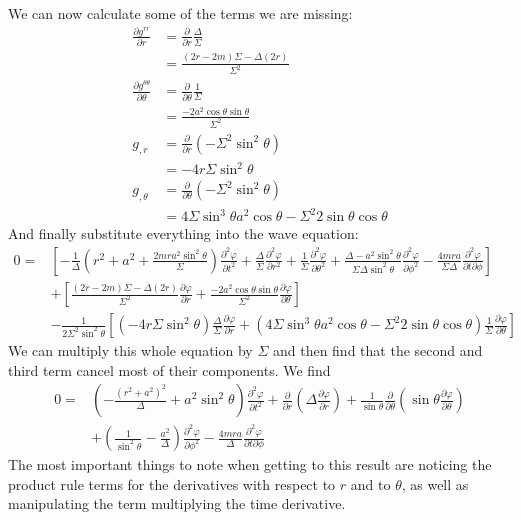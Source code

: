 \documentclass[11pt]{article}
\numberwithin{equation}{section}
\numberwithin{figure}{section}
\numberwithin{table}{section}
\begin{document}
We can now calculate some of the terms we are missing:
\begin{align*}
    \frac{\partial g^{rr}}{\partial r}&=\frac{\partial}{\partial r}\frac{\Delta}{\Sigma}\\
    &=\frac{(2r-2m)\Sigma-\Delta(2r)}{\Sigma^2}\\
    \frac{\partial g^{\theta\theta}}{\partial \theta}&=\frac{\partial}{\partial \theta}\frac{1}{\Sigma}\\
    &=\frac{-2a^2\cos\theta\sin\theta}{\Sigma^2}\\
    g_{,r}&=\frac{\partial}{\partial r}(-\Sigma^2\sin^2\theta)\\
    &=-4r\Sigma\sin^2\theta\\
    g_{,\theta}&=\frac{\partial}{\partial \theta}(-\Sigma^2\sin^2\theta)\\
    &=4\Sigma\sin^3\theta a^2\cos\theta-\Sigma^2 2\sin\theta\cos\theta
\end{align*}
And finally substitute everything into the wave equation:
\begin{align*}
    0=&\left[-\frac{1}{\Delta}\left(r^2+a^2+\frac{2mra^2\sin^2\theta}{\Sigma}\right)\frac{\partial^2\varphi}{\partial t^2}+\frac{\Delta}{\Sigma}\frac{\partial^2\varphi}{\partial r^2}+\frac{1}{\Sigma}\frac{\partial^2\varphi}{\partial\theta^2}+\frac{\Delta-a^2\sin^2\theta}{\Sigma\Delta\sin^2\theta}\frac{\partial^2\varphi}{\partial\phi^2}-\frac{4mra}{\Sigma\Delta}\frac{\partial^2\varphi}{\partial t\partial\phi}\right]\\
    &+\left[\frac{(2r-2m)\Sigma-\Delta(2r)}{\Sigma^2}\frac{\partial\varphi}{\partial r}+\frac{-2a^2\cos\theta\sin\theta}{\Sigma^2}\frac{\partial \varphi}{\partial \theta}\right]\\&-\frac{1}{2\Sigma^2\sin^2\theta}\left[(-4r\Sigma\sin^2\theta)\frac{\Delta}{\Sigma}\frac{\partial\varphi}{\partial r}+(4\Sigma\sin^3\theta a^2\cos\theta-\Sigma^2 2\sin\theta\cos\theta)\frac{1}{\Sigma}\frac{\partial\varphi}{\partial\theta}\right]
\end{align*}
We can multiply this whole equation by $\Sigma$ and then find that the second and third term cancel most of their components. We find
\begin{equation}
    \begin{aligned}
        0=&\left(-\frac{(r^2+a^2)^2}{\Delta}+a^2\sin^2\theta\right)\frac{\partial^2\varphi}{\partial t^2}+\frac{\partial}{\partial r}\left(\Delta\frac{\partial\varphi}{\partial r}\right)+\frac{1}{\sin\theta}\frac{\partial}{\partial\theta}\left(\sin\theta\frac{\partial\varphi}{\partial\theta}\right)\\&+\left(\frac{1}{\sin^2\theta}-\frac{a^2}{\Delta}\right)\frac{\partial^2\varphi}{\partial\phi^2}-\frac{4mra}{\Delta}\frac{\partial^2\varphi}{\partial t\partial\phi}
    \end{aligned}
    \label{eqn:wave equation kerr metric}
\end{equation}
The most important things to note when getting to this result are noticing the product rule terms for the derivatives with respect to $r$ and to $\theta$, as well as manipulating the term multiplying the time derivative. 
\end{document}

